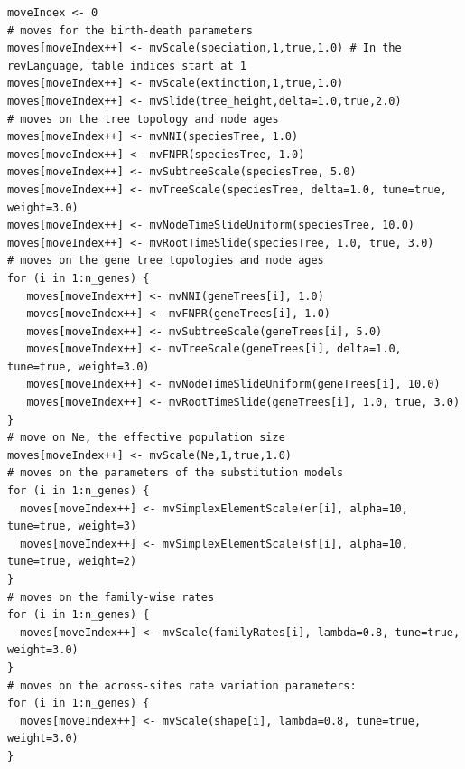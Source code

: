 \documentclass[11pt]{article}
\begin{document}
{\begin{framed}
{\tt \begin{snugshade*}
\begin{lstlisting}
moveIndex <- 0
# moves for the birth-death parameters
moves[moveIndex++] <- mvScale(speciation,1,true,1.0) # In the revLanguage, table indices start at 1
moves[moveIndex++] <- mvScale(extinction,1,true,1.0)
moves[moveIndex++] <- mvSlide(tree_height,delta=1.0,true,2.0)
# moves on the tree topology and node ages
moves[moveIndex++] <- mvNNI(speciesTree, 1.0)
moves[moveIndex++] <- mvFNPR(speciesTree, 1.0)
moves[moveIndex++] <- mvSubtreeScale(speciesTree, 5.0)
moves[moveIndex++] <- mvTreeScale(speciesTree, delta=1.0, tune=true, weight=3.0)
moves[moveIndex++] <- mvNodeTimeSlideUniform(speciesTree, 10.0)
moves[moveIndex++] <- mvRootTimeSlide(speciesTree, 1.0, true, 3.0)
# moves on the gene tree topologies and node ages
for (i in 1:n_genes) {
   moves[moveIndex++] <- mvNNI(geneTrees[i], 1.0)
   moves[moveIndex++] <- mvFNPR(geneTrees[i], 1.0)
   moves[moveIndex++] <- mvSubtreeScale(geneTrees[i], 5.0)
   moves[moveIndex++] <- mvTreeScale(geneTrees[i], delta=1.0, tune=true, weight=3.0)
   moves[moveIndex++] <- mvNodeTimeSlideUniform(geneTrees[i], 10.0)
   moves[moveIndex++] <- mvRootTimeSlide(geneTrees[i], 1.0, true, 3.0)
}
# move on Ne, the effective population size
moves[moveIndex++] <- mvScale(Ne,1,true,1.0)
# moves on the parameters of the substitution models
for (i in 1:n_genes) {
  moves[moveIndex++] <- mvSimplexElementScale(er[i], alpha=10, tune=true, weight=3) 
  moves[moveIndex++] <- mvSimplexElementScale(sf[i], alpha=10, tune=true, weight=2) 
}
# moves on the family-wise rates
for (i in 1:n_genes) {
  moves[moveIndex++] <- mvScale(familyRates[i], lambda=0.8, tune=true, weight=3.0)
}
# moves on the across-sites rate variation parameters:
for (i in 1:n_genes) {
  moves[moveIndex++] <- mvScale(shape[i], lambda=0.8, tune=true, weight=3.0)
}
\end{lstlisting}
\end{snugshade*}}


\end{framed}}
\end{document}
